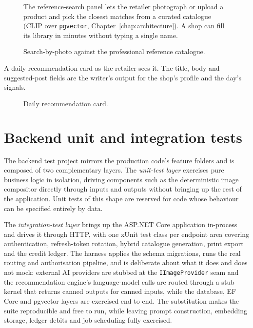 \begin{figure}[H]
\begin{minipage}[c]{0.42\textwidth}
\centering
{}
\end{minipage}\hfill
\begin{minipage}[c]{0.52\textwidth}
\raggedright
The reference-search panel lets the retailer photograph or upload a product and pick the closest matches from a curated catalogue (CLIP over \texttt{pgvector}, Chapter~\ref{chap:architecture}). A shop can fill its library in minutes without typing a single name.
\end{minipage}
\caption{Search-by-photo against the professional reference catalogue.}
\label{fig:result-references}
\end{figure}

A daily recommendation card as the retailer sees it. The title, body and suggested-post fields are the writer's output for the shop's profile and the day's signals.

\begin{figure}[H]
\centering
{}
\caption{Daily recommendation card.}
\label{fig:result-recommendation}
\end{figure}

\section{Backend unit and integration tests}
\label{sec:backend-tests}

The backend test project mirrors the production code's feature folders and is composed of two complementary layers. The \emph{unit-test layer} exercises pure business logic in isolation, driving components such as the deterministic image compositor directly through inputs and outputs without bringing up the rest of the application. Unit tests of this shape are reserved for code whose behaviour can be specified entirely by data.

The \emph{integration-test layer} brings up the ASP.NET Core application in-process and drives it through HTTP, with one xUnit test class per endpoint area covering authentication, refresh-token rotation, hybrid catalogue generation, print export and the credit ledger. The harness applies the schema migrations, runs the real routing and authorisation pipeline, and is deliberate about what it does and does not mock: external AI providers are stubbed at the \texttt{IImageProvider} seam and the recommendation engine's language-model calls are routed through a stub kernel that returns canned outputs for canned inputs, while the database, EF Core and pgvector layers are exercised end to end. The substitution makes the suite reproducible and free to run, while leaving prompt construction, embedding storage, ledger debits and job scheduling fully exercised.

